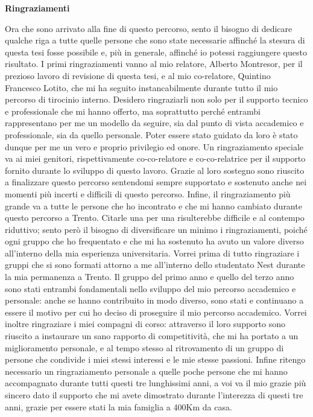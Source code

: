 \cleardoublepage
\thispagestyle{empty}

\begin{center}
  {\bf \Huge Ringraziamenti}
\end{center}
\vspace{2cm}
Ora che sono arrivato alla fine di questo percorso, sento il bisogno di dedicare qualche riga a tutte quelle persone che sono state necessarie affinché la stesura di questa tesi fosse possibile e, più in generale, affinché io potessi raggiungere questo risultato.
\newline
\newline
I primi ringraziamenti vanno al mio relatore, Alberto Montresor, per il prezioso lavoro di revisione di questa tesi, e al mio co-relatore, Quintino Francesco Lotito, che mi ha seguito instancabilmente durante tutto il mio percorso di tirocinio interno.
Desidero ringraziarli non solo per il supporto tecnico e professionale che mi hanno offerto, ma soprattutto perché entrambi rappresentano per me un modello da seguire, sia dal punto di vista accademico e professionale, sia da quello personale.
Poter essere stato guidato da loro è stato dunque per me un vero e proprio privilegio ed onore.
\newline
\newline
Un ringraziamento speciale va ai miei genitori, rispettivamente co-co-relatore e co-co-relatrice per il supporto fornito durante lo sviluppo di questo lavoro.
Grazie al loro sostegno sono riuscito a finalizzare questo percorso sentendomi sempre supportato e sostenuto anche nei momenti più incerti e difficili di questo percorso.
\newline
\newline
Infine, il ringraziamento più grande va a tutte le persone che ho incontrato e che mi hanno cambiato durante questo percorso a Trento. Citarle una per una risulterebbe difficile e al contempo riduttivo; sento però il bisogno di diversificare un minimo i ringraziamenti, poiché ogni gruppo che ho frequentato e che mi ha sostenuto ha avuto un valore diverso all'interno della mia esperienza universitaria.
Vorrei prima di tutto ringraziare i gruppi che si sono formati attorno a me all'interno dello studentato Nest durante la mia permanenza a Trento.
Il gruppo del primo anno e quello del terzo anno sono stati entrambi fondamentali nello sviluppo del mio percorso accademico e personale: anche se hanno contribuito in modo diverso, sono stati e continuano a essere il motivo per cui ho deciso di proseguire il mio percorso accademico.
Vorrei inoltre ringraziare i miei compagni di corso: attraverso il loro supporto sono riuscito a instaurare un sano rapporto di competitività, che mi ha portato a un miglioramento personale, e al tempo stesso al ritrovamento di un gruppo di persone che condivide i miei stessi interessi e le mie stesse passioni.
Infine ritengo necessario un ringraziamento personale a quelle poche persone che mi hanno accompagnato durante tutti questi tre lunghissimi anni, a voi va il mio grazie più sincero dato il supporto che mi avete dimostrato durante l'interezza di questi tre anni, grazie per essere stati la mia famiglia a 400Km da casa.